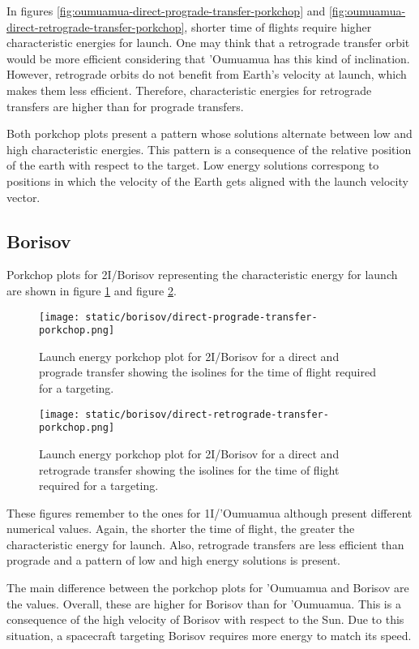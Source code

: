 In figures \ref{fig:oumuamua-direct-prograde-transfer-porkchop} and
\ref{fig:oumuamua-direct-retrograde-transfer-porkchop}, shorter time of flights
require higher characteristic energies for launch. One may think that a
retrograde transfer orbit would be more efficient considering that 'Oumuamua has
this kind of inclination. However, retrograde orbits do not benefit from Earth's
velocity at launch, which makes them less efficient. Therefore, characteristic
energies for retrograde transfers are higher than for prograde transfers.

Both porkchop plots present a pattern whose solutions alternate between low and
high characteristic energies. This pattern is a consequence of the relative
position of the earth with respect to the target. Low energy solutions
correspong to positions in which the velocity of the Earth gets aligned with the
launch velocity vector.

\subsection{Borisov}

Porkchop plots for 2I/Borisov representing the characteristic energy for launch
are shown in figure \ref{fig:borisov-direct-prograde-transfer-porkchop} and
figure \ref{fig:borisov-direct-retrograde-transfer-porkchop}.

\begin{figure}[H]
  \centering
  \texttt{[image: static/borisov/direct-prograde-transfer-porkchop.png]}
        \caption[Direct and prograde launch energy porkchop for
        2I/Borisov]{Launch energy porkchop plot for 2I/Borisov for a direct and prograde
        transfer showing the isolines for
        the time of flight required for a targeting.}
  \label{fig:borisov-direct-prograde-transfer-porkchop}
\end{figure}

\begin{figure}[H]
  \centering
  \texttt{[image: static/borisov/direct-retrograde-transfer-porkchop.png]}
        \caption[Direct and retrograde launch energy porkchop for
        2I/Borisov]{Launch energy porkchop plot for 2I/Borisov for a direct and
        retrograde transfer showing the isolines for
        the time of flight required for a targeting.}
  \label{fig:borisov-direct-retrograde-transfer-porkchop}
\end{figure}

These figures remember to the ones for 1I/'Oumuamua although present different
numerical values. Again, the shorter the time of flight, the greater the
characteristic energy for launch. Also, retrograde transfers are less efficient
than prograde and a pattern of low and high energy solutions is present.

The main difference between the porkchop plots for 'Oumuamua and Borisov are the
values. Overall, these are higher for Borisov than for 'Oumuamua. This is a
consequence of the high velocity of Borisov with respect to the Sun. Due to this
situation, a spacecraft targeting Borisov requires more energy to match its
speed.
